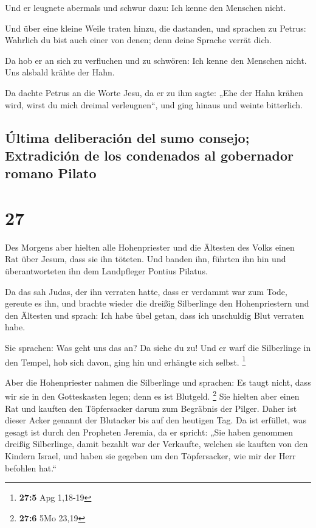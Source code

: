  Und er leugnete abermals und schwur dazu: Ich kenne den
Menschen nicht.

 Und über eine kleine Weile traten hinzu, die dastanden,
und sprachen zu Petrus: Wahrlich du bist auch einer von denen; denn
deine Sprache verrät dich.

 Da hob er an sich zu verfluchen und zu schwören: Ich
kenne den Menschen nicht. Uns alsbald krähte der Hahn.

 Da dachte Petrus an die Worte Jesu, da er zu ihm sagte:
„Ehe der Hahn krähen wird, wirst du mich dreimal verleugnen``, und ging
hinaus und weinte bitterlich.

\hypertarget{uxfaltima-deliberaciuxf3n-del-sumo-consejo-extradiciuxf3n-de-los-condenados-al-gobernador-romano-pilato}{%
\subsection{Última deliberación del sumo consejo; Extradición de los
condenados al gobernador romano
Pilato}\label{uxfaltima-deliberaciuxf3n-del-sumo-consejo-extradiciuxf3n-de-los-condenados-al-gobernador-romano-pilato}}

\hypertarget{section-26}{%
\section{27}\label{section-26}}

 Des Morgens aber hielten alle Hohenpriester und die
Ältesten des Volks einen Rat über Jesum, dass sie ihn töteten.
 Und banden ihn, führten ihn hin und überantworteten ihn
dem Landpfleger Pontius Pilatus.

 Da das sah Judas, der ihn verraten hatte, dass er
verdammt war zum Tode, gereute es ihn, und brachte wieder die dreißig
Silberlinge den Hohenpriestern und den Ältesten  und
sprach: Ich habe übel getan, dass ich unschuldig Blut verraten habe.

 Sie sprachen: Was geht uns das an? Da siehe du zu! Und er
warf die Silberlinge in den Tempel, hob sich davon, ging hin und
erhängte sich selbst. \footnote{\textbf{27:5} Apg 1,18-19}

 Aber die Hohenpriester nahmen die Silberlinge und
sprachen: Es taugt nicht, dass wir sie in den Gotteskasten legen; denn
es ist Blutgeld. \footnote{\textbf{27:6} 5Mo 23,19}  Sie
hielten aber einen Rat und kauften den Töpfersacker darum zum Begräbnis
der Pilger.  Daher ist dieser Acker genannt der Blutacker
bis auf den heutigen Tag.  Da ist erfüllet, was gesagt ist
durch den Propheten Jeremia, da er spricht: „Sie haben genommen dreißig
Silberlinge, damit bezahlt war der Verkaufte, welchen sie kauften von
den Kindern Israel,  und haben sie gegeben um den
Töpfersacker, wie mir der Herr befohlen hat.``

